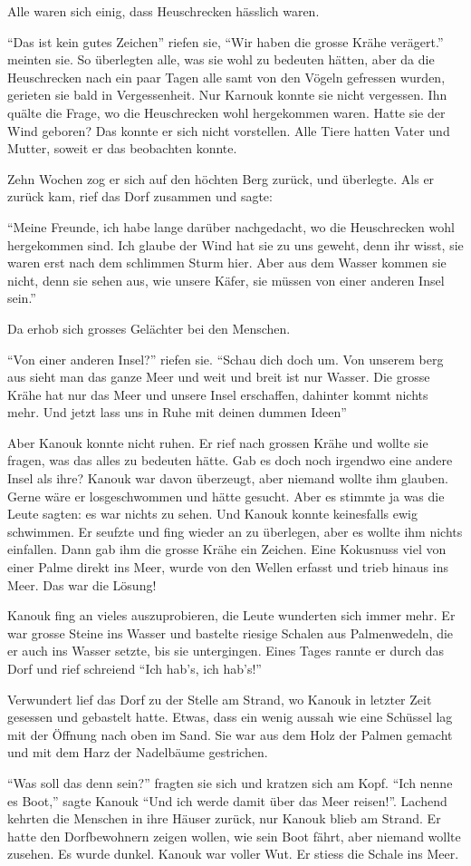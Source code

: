 Alle waren sich einig, dass Heuschrecken hässlich waren. 

\enquote{Das ist kein gutes Zeichen} riefen sie, \enquote{Wir haben die grosse Krähe verägert.} meinten sie. So überlegten alle, was sie wohl zu bedeuten hätten, aber da die Heuschrecken nach ein paar Tagen alle samt von den Vögeln gefressen wurden, gerieten sie bald in Vergessenheit. Nur Karnouk konnte sie nicht vergessen. Ihn quälte die Frage, wo die Heuschrecken wohl hergekommen waren. Hatte sie der Wind geboren? Das konnte er sich nicht vorstellen. Alle Tiere hatten Vater und Mutter, soweit er das beobachten konnte. 

Zehn Wochen zog er sich auf den höchten Berg zurück, und überlegte. Als er zurück kam, rief das Dorf zusammen und sagte: 

\enquote{Meine Freunde, ich habe lange darüber nachgedacht, wo die Heuschrecken wohl hergekommen sind. Ich glaube der Wind hat sie zu uns geweht, denn ihr wisst, sie waren erst nach dem schlimmen Sturm hier. Aber aus dem Wasser kommen sie nicht, denn sie sehen aus, wie unsere Käfer, sie müssen von einer anderen Insel sein.}

Da erhob sich grosses Gelächter bei den Menschen.

\enquote{Von einer anderen Insel?} riefen sie. \enquote{Schau dich doch um. Von unserem berg aus sieht man das ganze Meer und weit und breit ist nur Wasser. Die grosse Krähe hat nur das Meer und unsere Insel erschaffen, dahinter kommt nichts mehr. Und jetzt lass uns in Ruhe mit deinen dummen Ideen}

Aber Kanouk konnte nicht ruhen. Er rief nach grossen Krähe und wollte sie fragen, was das alles zu bedeuten hätte. Gab es doch noch irgendwo eine andere Insel als ihre? Kanouk war davon überzeugt, aber niemand wollte ihm glauben. Gerne wäre er losgeschwommen und hätte gesucht. Aber es stimmte ja was die Leute sagten: es war nichts zu sehen. Und Kanouk konnte keinesfalls ewig schwimmen. Er seufzte und fing wieder an zu überlegen, aber es wollte ihm nichts einfallen. Dann gab ihm die grosse Krähe ein Zeichen. Eine Kokusnuss viel von einer Palme direkt ins Meer, wurde von den Wellen erfasst und trieb hinaus ins Meer. Das war die Lösung! 

Kanouk fing an vieles auszuprobieren, die Leute wunderten sich immer mehr. Er war grosse Steine ins Wasser und bastelte riesige Schalen aus Palmenwedeln, die er auch ins Wasser setzte, bis sie untergingen. Eines Tages rannte er durch das Dorf und rief schreiend \enquote{Ich hab's, ich hab's!}

Verwundert lief das Dorf zu der Stelle am Strand, wo Kanouk in letzter Zeit gesessen und gebastelt hatte. Etwas, dass ein wenig aussah wie eine Schüssel lag mit der Öffnung nach oben im Sand. Sie war aus dem Holz der Palmen gemacht und mit dem Harz der Nadelbäume gestrichen. 

\enquote{Was soll das denn sein?} fragten sie sich und kratzen sich am Kopf. \enquote{Ich nenne es Boot,} sagte Kanouk \enquote{Und ich werde damit über das Meer reisen!}. Lachend kehrten die Menschen in ihre Häuser zurück, nur Kanouk blieb am Strand. Er hatte den Dorfbewohnern zeigen wollen, wie sein Boot fährt, aber niemand wollte zusehen. Es wurde dunkel. Kanouk war voller Wut. Er stiess die Schale ins Meer.
